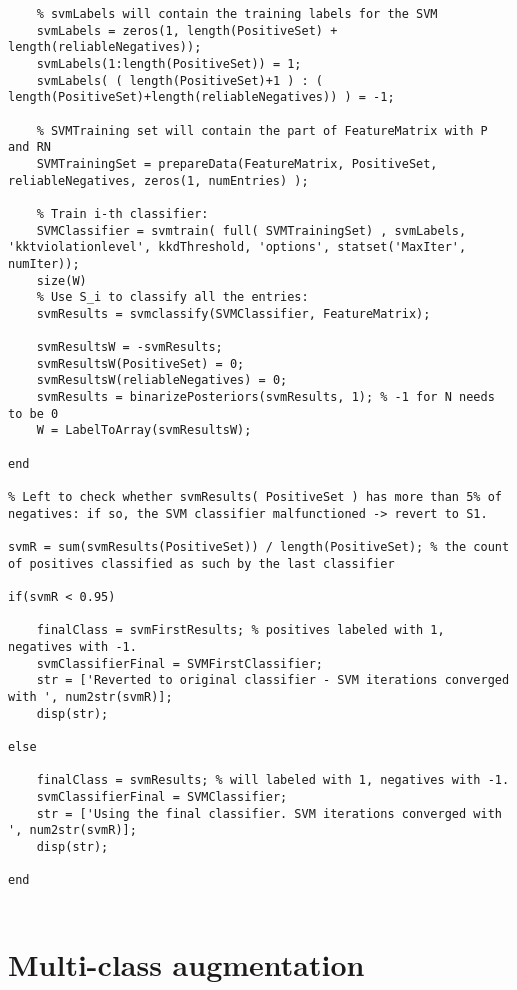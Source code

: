 \documentclass[12pt,twoside,notitlepage,amsart]{report} %
\begin{document}
\begin{lstlisting}
    % svmLabels will contain the training labels for the SVM
    svmLabels = zeros(1, length(PositiveSet) + length(reliableNegatives));
    svmLabels(1:length(PositiveSet)) = 1;
    svmLabels( ( length(PositiveSet)+1 ) : ( length(PositiveSet)+length(reliableNegatives)) ) = -1;

    % SVMTraining set will contain the part of FeatureMatrix with P and RN
    SVMTrainingSet = prepareData(FeatureMatrix, PositiveSet, reliableNegatives, zeros(1, numEntries) );
    
    % Train i-th classifier:
    SVMClassifier = svmtrain( full( SVMTrainingSet) , svmLabels, 'kktviolationlevel', kkdThreshold, 'options', statset('MaxIter', numIter));    
    size(W)
    % Use S_i to classify all the entries:
    svmResults = svmclassify(SVMClassifier, FeatureMatrix);

    svmResultsW = -svmResults;
    svmResultsW(PositiveSet) = 0;
    svmResultsW(reliableNegatives) = 0;
    svmResults = binarizePosteriors(svmResults, 1); % -1 for N needs to be 0
    W = LabelToArray(svmResultsW);
    
end

% Left to check whether svmResults( PositiveSet ) has more than 5% of negatives: if so, the SVM classifier malfunctioned -> revert to S1.

svmR = sum(svmResults(PositiveSet)) / length(PositiveSet); % the count of positives classified as such by the last classifier

if(svmR < 0.95) 

    finalClass = svmFirstResults; % positives labeled with 1, negatives with -1.
    svmClassifierFinal = SVMFirstClassifier;
    str = ['Reverted to original classifier - SVM iterations converged with ', num2str(svmR)];
    disp(str);
    
else
    
    finalClass = svmResults; % will labeled with 1, negatives with -1.
    svmClassifierFinal = SVMClassifier;
    str = ['Using the final classifier. SVM iterations converged with ', num2str(svmR)];
    disp(str);
    
end
	
	\end{lstlisting}

\clearpage

\section{Multi-class augmentation}
\end{document}
